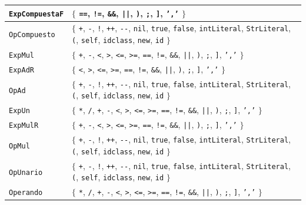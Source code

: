 \begin{longtable}{|
>{\raggedright\arraybackslash}p{}|
>{\raggedright\arraybackslash}p{}|}
\texttt{ExpCompuestaF} & \(\{\) \texttt{==}, \texttt{!=}, \texttt{\&\&}, \texttt{||}, \texttt{)}, \texttt{;}, \texttt{]}, \texttt{','} \(\}\) \\ \hline
\texttt{OpCompuesto} & \(\{\) \texttt{+}, \texttt{-}, \texttt{!}, \texttt{++}, \texttt{-{}-}, \texttt{nil}, \texttt{true}, \texttt{false}, \texttt{intLiteral}, \texttt{StrLiteral}, \texttt{(}, \texttt{self}, \texttt{idclass}, \texttt{new}, \texttt{id} \(\}\) \\ \hline
\texttt{ExpMul} & \(\{\) \texttt{+}, \texttt{-}, \texttt{<}, \texttt{>}, \texttt{<=}, \texttt{>=}, \texttt{==}, \texttt{!=}, \texttt{\&\&}, \texttt{||}, \texttt{)}, \texttt{;}, \texttt{]}, \texttt{','} \(\}\) \\ \hline
\texttt{ExpAdR} & \(\{\) \texttt{<}, \texttt{>}, \texttt{<=}, \texttt{>=}, \texttt{==}, \texttt{!=}, \texttt{\&\&}, \texttt{||}, \texttt{)}, \texttt{;}, \texttt{]}, \texttt{','} \(\}\) \\ \hline
\texttt{OpAd} & \(\{\) \texttt{+}, \texttt{-}, \texttt{!}, \texttt{++}, \texttt{-{}-}, \texttt{nil}, \texttt{true}, \texttt{false}, \texttt{intLiteral}, \texttt{StrLiteral}, \texttt{(}, \texttt{self}, \texttt{idclass}, \texttt{new}, \texttt{id} \(\}\) \\ \hline
\texttt{ExpUn} & \(\{\) \texttt{*}, \texttt{/}, \texttt{+}, \texttt{-}, \texttt{<}, \texttt{>}, \texttt{<=}, \texttt{>=}, \texttt{==}, \texttt{!=}, \texttt{\&\&}, \texttt{||}, \texttt{)}, \texttt{;}, \texttt{]}, \texttt{','} \(\}\) \\ \hline
\texttt{ExpMulR} & \(\{\) \texttt{+}, \texttt{-}, \texttt{<}, \texttt{>}, \texttt{<=}, \texttt{>=}, \texttt{==}, \texttt{!=}, \texttt{\&\&}, \texttt{||}, \texttt{)}, \texttt{;}, \texttt{]}, \texttt{','} \(\}\) \\ \hline
\texttt{OpMul} & \(\{\) \texttt{+}, \texttt{-}, \texttt{!}, \texttt{++}, \texttt{-{}-}, \texttt{nil}, \texttt{true}, \texttt{false}, \texttt{intLiteral}, \texttt{StrLiteral}, \texttt{(}, \texttt{self}, \texttt{idclass}, \texttt{new}, \texttt{id} \(\}\) \\ \hline
\texttt{OpUnario} & \(\{\) \texttt{+}, \texttt{-}, \texttt{!}, \texttt{++}, \texttt{-{}-}, \texttt{nil}, \texttt{true}, \texttt{false}, \texttt{intLiteral}, \texttt{StrLiteral}, \texttt{(}, \texttt{self}, \texttt{idclass}, \texttt{new}, \texttt{id} \(\}\) \\ \hline
\texttt{Operando} & \(\{\) \texttt{*}, \texttt{/}, \texttt{+}, \texttt{-}, \texttt{<}, \texttt{>}, \texttt{<=}, \texttt{>=}, \texttt{==}, \texttt{!=}, \texttt{\&\&}, \texttt{||}, \texttt{)}, \texttt{;}, \texttt{]}, \texttt{','} \(\}\) \\ \hline

\end{longtable}
